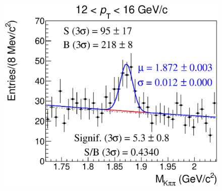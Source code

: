 \documentclass[b5paper,10pt,twoside,oldstyle,classica]{toptesi}
\begin{document}
\begin{figure}[h]
\begin{center}
{\includegraphics[scale = 0.25]{MassFitSet1_Pt6.eps}}
\end{center}
\end{figure}
\clearpage
\end{document}

